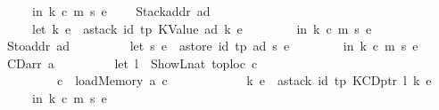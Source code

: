 \begin{isabellebody}
\ \ \ \ \ \ \ \ in\ {\isacharparenleft}{\kern0pt}k{\isacharcomma}{\kern0pt}\ c{\isacharcomma}{\kern0pt}\ m{\isacharcomma}{\kern0pt}\ s{\isacharprime}{\kern0pt}{\isacharcomma}{\kern0pt}\ e{\isacharprime}{\kern0pt}{\isacharparenright}{\kern0pt}\isanewline
\ \ {\isacharbar}{\kern0pt}\ \ Stackaddr\ ad\ {\isasymRightarrow}\isanewline
\ \ \ \ \ \ \ \ let\ {\isacharparenleft}{\kern0pt}k{\isacharprime}{\kern0pt}{\isacharcomma}{\kern0pt}\ e{\isacharprime}{\kern0pt}{\isacharparenright}{\kern0pt}\ {\isacharequal}{\kern0pt}\ astack\ id{\isacharprime}{\kern0pt}\ tp\ {\isacharparenleft}{\kern0pt}KValue\ ad{\isacharparenright}{\kern0pt}\ {\isacharparenleft}{\kern0pt}k{\isacharcomma}{\kern0pt}\ e{\isacharparenright}{\kern0pt}\isanewline
\ \ \ \ \ \ \ \ in\ {\isacharparenleft}{\kern0pt}k{\isacharprime}{\kern0pt}{\isacharcomma}{\kern0pt}\ c{\isacharcomma}{\kern0pt}\ m{\isacharcomma}{\kern0pt}\ s{\isacharcomma}{\kern0pt}\ e{\isacharprime}{\kern0pt}{\isacharparenright}{\kern0pt}\isanewline
\ \ {\isacharbar}{\kern0pt}\ \ Stoaddr\ ad\ {\isasymRightarrow}\isanewline
\ \ \ \ \ \ \ \ let\ {\isacharparenleft}{\kern0pt}s{\isacharprime}{\kern0pt}{\isacharcomma}{\kern0pt}\ e{\isacharprime}{\kern0pt}{\isacharparenright}{\kern0pt}\ {\isacharequal}{\kern0pt}\ astore\ id{\isacharprime}{\kern0pt}\ tp\ ad\ {\isacharparenleft}{\kern0pt}s{\isacharcomma}{\kern0pt}\ e{\isacharparenright}{\kern0pt}\isanewline
\ \ \ \ \ \ \ \ in\ {\isacharparenleft}{\kern0pt}k{\isacharcomma}{\kern0pt}\ c{\isacharcomma}{\kern0pt}\ m{\isacharcomma}{\kern0pt}\ s{\isacharprime}{\kern0pt}{\isacharcomma}{\kern0pt}\ e{\isacharprime}{\kern0pt}{\isacharparenright}{\kern0pt}\isanewline
\ \ {\isacharbar}{\kern0pt}\ \ CDarr\ a\ {\isasymRightarrow}\isanewline
\ \ \ \ \ \ \ \ let\ l\ {\isacharequal}{\kern0pt}\ ShowL\isactrlsub n\isactrlsub a\isactrlsub t\ {\isacharparenleft}{\kern0pt}toploc\ c{\isacharparenright}{\kern0pt}{\isacharsemicolon}{\kern0pt}\isanewline
\ \ \ \ \ \ \ \ \ \ \ \ c{\isacharprime}{\kern0pt}\ {\isacharequal}{\kern0pt}\ load\isactrlsub M\isactrlsub e\isactrlsub m\isactrlsub o\isactrlsub r\isactrlsub y\ a\ c{\isacharsemicolon}{\kern0pt}\isanewline
\ \ \ \ \ \ \ \ \ \ \ \ {\isacharparenleft}{\kern0pt}k{\isacharprime}{\kern0pt}{\isacharcomma}{\kern0pt}\ e{\isacharprime}{\kern0pt}{\isacharparenright}{\kern0pt}\ {\isacharequal}{\kern0pt}\ astack\ id{\isacharprime}{\kern0pt}\ tp\ {\isacharparenleft}{\kern0pt}KCDptr\ l{\isacharparenright}{\kern0pt}\ {\isacharparenleft}{\kern0pt}k{\isacharcomma}{\kern0pt}\ e{\isacharparenright}{\kern0pt}\isanewline
\ \ \ \ \ \ \ \ in\ {\isacharparenleft}{\kern0pt}k{\isacharprime}{\kern0pt}{\isacharcomma}{\kern0pt}\ c{\isacharprime}{\kern0pt}{\isacharcomma}{\kern0pt}\ m{\isacharcomma}{\kern0pt}\ s{\isacharcomma}{\kern0pt}\ e{\isacharprime}{\kern0pt}{\isacharparenright}{\kern0pt}\isanewline

\end{isabellebody}
